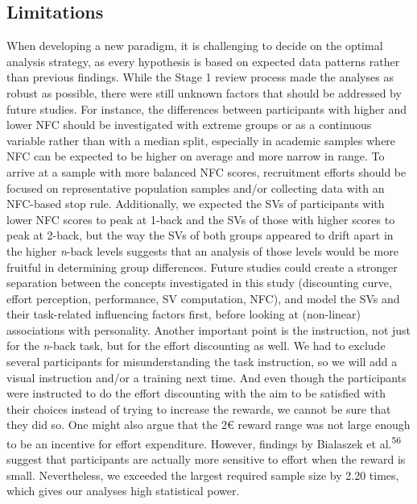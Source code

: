 \documentclass[
  man,floatsintext]{apa6}
\begin{document}
\hypertarget{limitations}{%
\subsection{Limitations}\label{limitations}}

When developing a new paradigm, it is challenging to decide on the optimal analysis strategy, as every hypothesis is based on expected data patterns rather than previous findings.
While the Stage 1 review process made the analyses as robust as possible, there were still unknown factors that should be addressed by future studies.
For instance, the differences between participants with higher and lower NFC should be investigated with extreme groups or as a continuous variable rather than with a median split, especially in academic samples where NFC can be expected to be higher on average and more narrow in range.
To arrive at a sample with more balanced NFC scores, recruitment efforts should be focused on representative population samples and/or collecting data with an NFC-based stop rule.
Additionally, we expected the SVs of participants with lower NFC scores to peak at 1-back and the SVs of those with higher scores to peak at 2-back, but the way the SVs of both groups appeared to drift apart in the higher \emph{n}-back levels suggests that an analysis of those levels would be more fruitful in determining group differences.
Future studies could create a stronger separation between the concepts investigated in this study (discounting curve, effort perception, performance, SV computation, NFC), and model the SVs and their task-related influencing factors first, before looking at (non-linear) associations with personality.
Another important point is the instruction, not just for the \emph{n}-back task, but for the effort discounting as well.
We had to exclude several participants for misunderstanding the task instruction, so we will add a visual instruction and/or a training next time.
And even though the participants were instructed to do the effort discounting with the aim to be satisfied with their choices instead of trying to increase the rewards, we cannot be sure that they did so.
One might also argue that the 2€ reward range was not large enough to be an incentive for effort expenditure.
However, findings by Bialaszek et al.\textsuperscript{56} suggest that participants are actually more sensitive to effort when the reward is small.
Nevertheless, we exceeded the largest required sample size by 2.20 times, which gives our analyses high statistical power.
\end{document}
